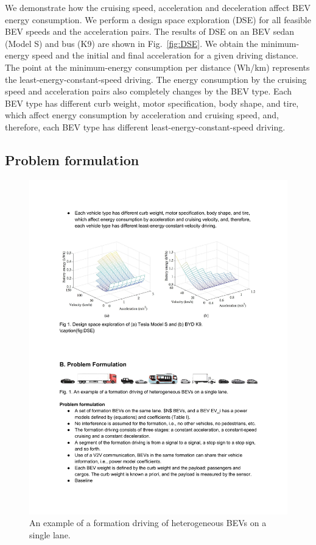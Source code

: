 \documentclass{IEEEtran}
\begin{document}
We demonstrate how the cruising speed, acceleration and deceleration affect BEV energy consumption. We perform a design space exploration (DSE) for all feasible BEV speeds and the acceleration pairs. The results of DSE on an BEV sedan (Model S) and bus (K9) are shown in Fig.~\ref{fig:DSE}. 
We obtain the minimum-energy speed and the initial and final acceleration for a given driving distance. 
The point at the minimum-energy consumption per distance (Wh/km) represents the least-energy-constant-speed driving. The energy consumption by the cruising speed and acceleration pairs also completely changes by the BEV type. 
Each BEV type has different curb weight, motor specification, body shape, and tire, which affect energy consumption by acceleration and cruising speed, and, therefore, each BEV type has different least-energy-constant-speed driving.

\subsection{Problem formulation} \label{subsec:problem}

\begin{figure}	%
\centering
\includegraphics[width=1.0\hsize]{Figures/Example.pdf}
\caption{An example of a formation driving of heterogeneous BEVs on a single lane.}
\label{fig:example}
\end{figure} 
\end{document}
